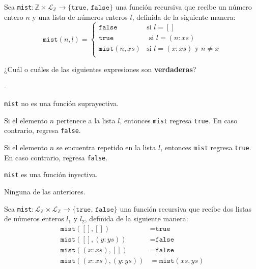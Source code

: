 \documentclass[12pt, a4paper]{exam}
\makeatletter
\renewenvironment{checkboxes}%
   {\setcounter{choice}{0}\list{\checkbox@char}%
      {%
        \settowidth{\leftmargin}{W.\hskip\labelsep\hskip 2.5em}%
        \def\choice{%
          \if@correctchoice
            \color@endgroup \endgroup
          \fi
          \stepcounter{choice}
          \item[\checked@char]
          \do@choice@pageinfo
        } %
        \def\CorrectChoice{%
          \if@correctchoice
            \color@endgroup \endgroup
          \fi
          \ifprintanswers
            \ifhmode \unskip\unskip\unvbox\voidb@x \fi
            \begingroup \color@begingroup \@correctchoicetrue
            \CorrectChoice@Emphasis
            \stepcounter{choice}
            \item[\checked@char]
          \else
            \stepcounter{choice}
            \item[\checked@char]
          \fi
          \do@choice@pageinfo
        } %
        \let\correctchoice\CorrectChoice
        \labelwidth\leftmargin\advance\labelwidth-\labelsep
        \topsep=0pt
        \partopsep=0pt
        \checkboxeshook
      }%
   }%
   {\if@correctchoice \color@endgroup \endgroup \fi \endlist}
\makeatother
\begin{document}
\begin{questions}
        \question
        {
            Sea \texttt{mist}$: \mathbb{Z} \times \mathcal{L}_\mathbb{Z} 
            \rightarrow \{\texttt{true, false}\}$ una función recursiva que 
            recibe un número entero $n$ y una lista de números enteros $l$, 
            definida de la siguiente manera:
            \[
                \texttt{mist}(n, l) =  
                \begin{cases} 
                \texttt{false} & \text{si } l = [] \\
                \texttt{true} & \text{ si } l = (n:xs) \\ 
                \texttt{mist}(n,xs) & \text{si } l = (x:xs) \text{ y } 
                n \neq x \\
                \end{cases}
            \]

            ¿Cuál o cuáles de las siguientes expresiones son \textbf{verdaderas}?
        }
        \begin{checkboxes}
            \choice \texttt{mist} no es una función suprayectiva. 

            \choice Si el elemento $n$ pertenece a la lista $l$, entonces 
            \texttt{mist} regresa \texttt{true}. En caso contrario, regresa 
            \texttt{false}. %

            \choice Si el elemento $n$ se encuentra repetido en la lista $l$, 
            entonces \texttt{mist} regresa \texttt{true}. En caso contrario, 
            regresa \texttt{false}. 

            \choice \texttt{mist} es una función inyectiva. 
            
            \choice Ninguna de las anteriores. 
        \end{checkboxes}

        \newpage
        \question
        {
            Sea \texttt{mist}$: \mathcal{L}_\mathbb{Z} \times 
            \mathcal{L}_\mathbb{Z} \rightarrow \{\texttt{true, false}\}$ una 
            función recursiva que recibe dos listas de números enteros $l_1$ 
            y $l_2$, definida de la siguiente manera:
            \begin{align*}
                \texttt{mist}([], []) &= \texttt{true} \\ 
                \texttt{mist}([], (y:ys)) &= \texttt{false} \\ 
                \texttt{mist}((x:xs), []) &= \texttt{false} \\
                \texttt{mist}((x:xs), (y:ys)) &= \texttt{mist}(xs, ys)
            \end{align*}

}
\end{questions}
\end{document}
